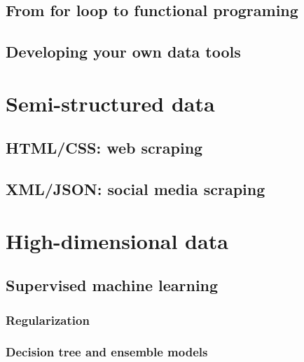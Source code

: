 \documentclass[
]{book}
\begin{document}
\hypertarget{from-for-loop-to-functional-programing}{%
\section{From for loop to functional programing}\label{from-for-loop-to-functional-programing}}

\hypertarget{developing-your-own-data-tools}{%
\section{Developing your own data tools}\label{developing-your-own-data-tools}}

\hypertarget{semi_structured_data}{%
\chapter{Semi-structured data}\label{semi_structured_data}}

\hypertarget{htmlcss-web-scraping}{%
\section{HTML/CSS: web scraping}\label{htmlcss-web-scraping}}

\hypertarget{xmljson-social-media-scraping}{%
\section{XML/JSON: social media scraping}\label{xmljson-social-media-scraping}}

\hypertarget{machine_learning}{%
\chapter{High-dimensional data}\label{machine_learning}}

\hypertarget{supervised-machine-learning}{%
\section{Supervised machine learning}\label{supervised-machine-learning}}

\hypertarget{regularization}{%
\subsection{Regularization}\label{regularization}}

\hypertarget{decision-tree-and-ensemble-models}{%
\subsection{Decision tree and ensemble models}\label{decision-tree-and-ensemble-models}}
\end{document}
